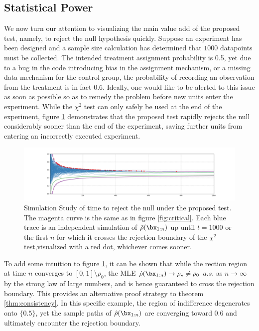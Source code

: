 \documentclass[11pt]{article}
\begin{document}
  \subsection{Statistical Power}
  We now turn our attention to visualizing the main value add of the proposed test, namely, to reject the null hypothesis quickly.
Suppose an experiment has been designed and a sample size calculation has determined that $1000$ datapoints must be collected.
The intended treatment assignment probability is 0.5, yet due to a bug in the code introducing bias in the assignment mechanism, or a missing data mechanism for the control group, the probability of recording an observation from the treatment is in fact 0.6.
Ideally, one would like to be alerted to this issue as soon as possible so as to remedy the problem before new units enter the experiment.
While the $\chi^2$ test can only safely be used at the end of the experiment,
  figure \ref{fig:ssrm_reject} demonstrates that the proposed test rapidly rejects the null considerably sooner than the end of the experiment, saving further units from entering an incorrectly executed experiment.
      \begin{figure}[H]
  \centering
  \includegraphics[scale=0.35]{images/ssrm_reject.png}
  \caption{Simulation Study of time to reject the null under the proposed test.
The magenta curve is the same as in figure \ref{fig:critical}.
Each blue trace is an independent simulation of $\hat{\rho}(\bx_{1:n})$ up until $t=1000$ or the first $n$ for which it crosses the rejection boundary of the $\chi^2$ test,visualized with a red dot, whichever comes sooner.
}
    \label{fig:ssrm_reject}
  \end{figure}
  \noindent To add some intuition to figure \ref{fig:ssrm_reject}, it can be shown that while the rection region at time $n$ converges to $[0,1]\setminus \rho_0$, the MLE $\hat{\rho}(\bx_{1:n}) \rightarrow \rho_\star \neq \rho_0$ $a.s.$ as $n\rightarrow \infty$ by the strong law of large numbers, and is hence guaranteed to cross the rejection boundary.
  This provides an alternative proof strategy to theorem \ref{thm:consistency}.
In this specific example, the region of indifference degenerates onto $\lbrace 0.5 \rbrace$, yet the sample paths of $\hat{\rho}(\bx_{1:n})$ are converging toward 0.6 and ultimately encounter the rejection boundary.
\end{document}

